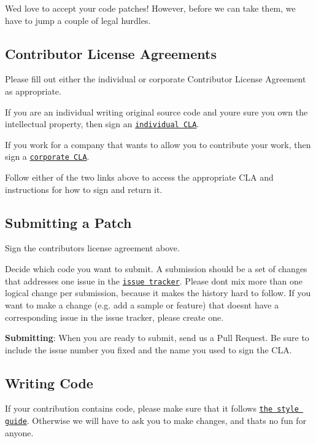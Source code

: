 We\textquotesingle{}d love to accept your code patches! However, before we can take them, we have to jump a couple of legal hurdles.

\subsection*{Contributor License Agreements}

Please fill out either the individual or corporate Contributor License Agreement as appropriate.


\begin{DoxyItemize}
\item If you are an individual writing original source code and you\textquotesingle{}re sure you own the intellectual property, then sign an \href{https://developers.google.com/open-source/cla/individual}{\tt individual C\+L\+A}.
\item If you work for a company that wants to allow you to contribute your work, then sign a \href{https://developers.google.com/open-source/cla/corporate}{\tt corporate C\+L\+A}.
\end{DoxyItemize}

Follow either of the two links above to access the appropriate C\+L\+A and instructions for how to sign and return it.

\subsection*{Submitting a Patch}


\begin{DoxyEnumerate}
\item Sign the contributors license agreement above.
\item Decide which code you want to submit. A submission should be a set of changes that addresses one issue in the \href{https://github.com/google/leveldb/issues}{\tt issue tracker}. Please don\textquotesingle{}t mix more than one logical change per submission, because it makes the history hard to follow. If you want to make a change (e.\+g. add a sample or feature) that doesn\textquotesingle{}t have a corresponding issue in the issue tracker, please create one.
\item {\bfseries Submitting}\+: When you are ready to submit, send us a Pull Request. Be sure to include the issue number you fixed and the name you used to sign the C\+L\+A.
\end{DoxyEnumerate}

\subsection*{Writing Code}

If your contribution contains code, please make sure that it follows \href{http://google-styleguide.googlecode.com/svn/trunk/cppguide.xml}{\tt the style guide}. Otherwise we will have to ask you to make changes, and that\textquotesingle{}s no fun for anyone. 